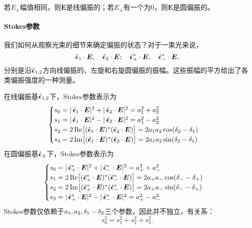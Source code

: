 若$E_\pm$幅值相同，则$\bm E$是线偏振的；若$E_\pm$有一个为0，则$\bm E$是圆偏振的。
\paragraph{Stokes参数}
我们如何从观察光束的细节来确定偏振的状态？对于一束光来说，
\begin{equation}
    \mathop{}\!\hat{\bm{\epsilon}}_1\cdot\bm E,\quad\mathop{}\!\hat{\bm{\epsilon}}_2\cdot\bm E;\quad\mathop{}\!\hat{\bm{\epsilon}}_+^\ast\cdot\bm E,\quad\mathop{}\!\hat{\bm{\epsilon}}_-^\ast\cdot\bm E,
\end{equation}
分别是沿$\mathop{}\!\hat{\bm{\epsilon}}_{1,2}$方向线偏振的、左旋和右旋圆偏振的振幅。这些振幅的平方给出了各类偏振强度的一种测量。%

在线偏振基$\mathop{}\!\hat{\bm{\epsilon}}_{1,2}$下，Stokes参数表示为
\begin{equation}
    \begin{cases}
        s_0=|\uvec\epsilon_1\cdot\bm E|^2+|\uvec\epsilon_2\cdot\bm E|^2=a_1^2+a_2^2\\
        s_1=|\uvec\epsilon_1\cdot\bm E|^2-|\uvec\epsilon_2\cdot\bm E|^2=a_1^2-a_2^2\\
        s_2=2\Re\bigfkh{(\uvec\epsilon_1\cdot\bm E)\cj(\uvec\epsilon_2\cdot\bm E)}=2a_1a_2\cos(\vd_2-\vd_1)\\
        s_3=2\Im\bigfkh{(\uvec\epsilon_1\cdot\bm E)\cj(\uvec\epsilon_2\cdot\bm E)}=2a_1a_2\sin(\vd_2-\vd_1)
    \end{cases}
\end{equation}
在圆偏振基$\mathop{}\!\hat{\bm{\epsilon}}_\pm$下，Stokes参数表示为
\begin{equation}
    \begin{cases}
        s_0=|\uvec\epsilon_+\cj\cdot\bm E|^2+|\uvec\epsilon_-\cj\cdot\bm E|^2=a_+^2+a_-^2\\
        s_1=2\Re\bigfkh{(\uvec\epsilon_+\cj\cdot\bm E)\cj(\uvec\epsilon_-\cj\cdot\bm E)}=2a_+a_-\cos(\vd_--\vd_+)\\
        s_2=2\Im\bigfkh{(\uvec\epsilon_+\cj\cdot\bm E)\cj(\uvec\epsilon_-\cj\cdot\bm E)}=2a_+a_-\sin(\vd_--\vd_+)\\
        s_3=|\uvec\epsilon_+\cj\cdot\bm E|^2-|\uvec\epsilon_-\cj\cdot\bm E|^2=a_+^2-a_-^2
    \end{cases}
\end{equation}
Stokes参数仅依赖于$a_1,a_2,\mathop{}\!\delta_1-\mathop{}\!\delta_2$三个参数，因此并不独立，有关系：
\[
    s_0^2=s_1^2+s_2^2+s_3^2.
\]

